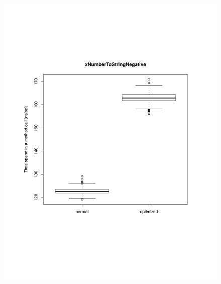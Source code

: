 \begin{figure}[H]
	\centering

	\centerline{
		\includegraphics[trim=0mm 60mm 20mm 50mm,scale=0.50]{pictures/boxplot_xNumberToStringNegative.pdf}
}
\end{figure}
